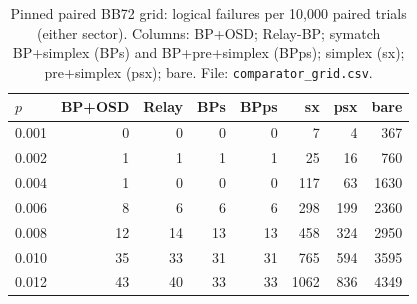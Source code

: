 \documentclass[11pt,a4paper]{article}
\begin{document}
\begin{table}[H]\centering\small
\caption{Pinned paired BB72 grid: logical failures per 10{,}000 paired
  trials (either sector). Columns: BP+OSD; Relay-BP; symatch
  BP+simplex (BPs) and BP+pre+simplex (BPps); simplex (sx);
  pre+simplex (psx); bare. File: \texttt{comparator\_grid.csv}.}
\label{tab:grid}
\begin{tabular}{@{}lrrrrrrr@{}}
\toprule
$p$ & BP+OSD & Relay & BPs & BPps & sx & psx & bare \\\midrule
0.001 & 0 & 0 & 0 & 0 & 7 & 4 & 367 \\
0.002 & 1 & 1 & 1 & 1 & 25 & 16 & 760 \\
0.004 & 1 & 0 & 0 & 0 & 117 & 63 & 1630 \\
0.006 & 8 & 6 & 6 & 6 & 298 & 199 & 2360 \\
0.008 & 12 & 14 & 13 & 13 & 458 & 324 & 2950 \\
0.010 & 35 & 33 & 31 & 31 & 765 & 594 & 3595 \\
0.012 & 43 & 40 & 33 & 33 & 1062 & 836 & 4349 \\
\bottomrule
\end{tabular}
\end{table}
\end{document}
